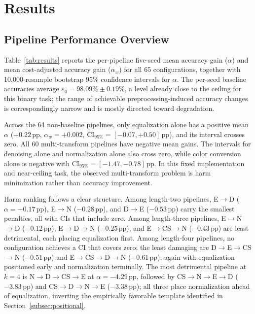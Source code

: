 \documentclass[preprint,review,12pt]{elsarticle}
\begin{document}
\section{Results}
\label{sec:results}

\subsection{Pipeline Performance Overview}
\label{subsec:results_overview}

Table~\ref{tab:results} reports the per-pipeline five-seed mean accuracy gain ($\alpha$) and mean cost-adjusted accuracy gain ($\alpha_w$) for all 65 configurations, together with 10{,}000-resample bootstrap 95\% confidence intervals for $\alpha$. The per-seed baseline accuracies average $\varepsilon_0 = 98.09\% \pm 0.19\%$, a level already close to the ceiling for this binary task; the range of achievable preprocessing-induced accuracy changes is correspondingly narrow and is mostly directed toward degradation.

\begingroup
\footnotesize

\endgroup

Across the 64 non-baseline pipelines, only equalization alone has a positive mean $\alpha$ ($+0.22$\,pp, $\alpha_w=+0.002$, CI$_{95\%}=[-0.07,+0.50]$\,pp), and its interval crosses zero. All 60 multi-transform pipelines have negative mean gains. The intervals for denoising alone and normalization alone also cross zero, while color conversion alone is negative with CI$_{95\%}=[-1.47,-0.78]$\,pp. In this fixed implementation and near-ceiling task, the observed multi-transform problem is harm minimization rather than accuracy improvement.

Harm ranking follows a clear structure. Among length-two pipelines, E$\to$D ($\alpha = -0.17$\,pp), E$\to$N ($-0.28$\,pp), and D$\to$E ($-0.53$\,pp) carry the smallest penalties, all with CIs that include zero. Among length-three pipelines, E$\to$N$\to$D ($-0.12$\,pp), E$\to$D$\to$N ($-0.25$\,pp), and E$\to$CS$\to$N ($-0.43$\,pp) are least detrimental, each placing equalization first. Among length-four pipelines, no configuration achieves a CI that covers zero; the least damaging are D$\to$E$\to$CS$\to$N ($-0.51$\,pp) and E$\to$CS$\to$D$\to$N ($-0.61$\,pp), again with equalization positioned early and normalization terminally. The most detrimental pipeline at $k=4$ is N$\to$D$\to$CS$\to$E at $\alpha = -4.29$\,pp, followed by CS$\to$N$\to$E$\to$D ($-3.83$\,pp) and CS$\to$D$\to$N$\to$E ($-3.38$\,pp); all three place normalization ahead of equalization, inverting the empirically favorable template identified in Section~\ref{subsec:positional}.
\end{document}
